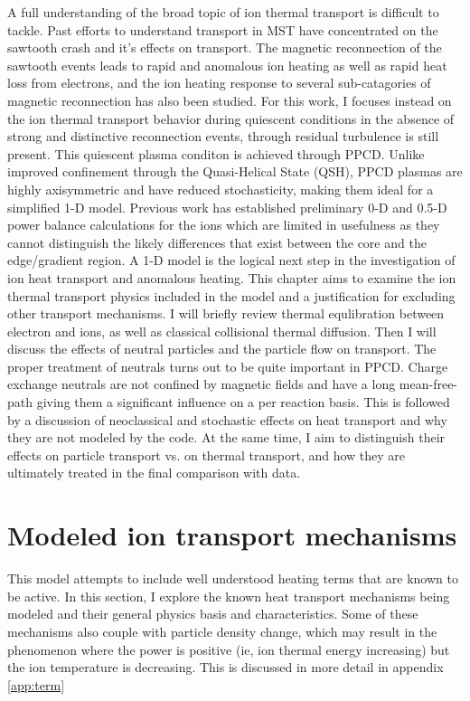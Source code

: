 \begin{refsection}
A full understanding of the broad topic of ion thermal transport is difficult to tackle. Past efforts to understand transport in MST have concentrated on the sawtooth crash and it's effects on transport. The magnetic reconnection of the sawtooth events leads to rapid and anomalous ion heating as well as rapid heat loss from electrons\cite{Chapman2010}, and the ion heating response to several sub-catagories of magnetic reconnection has also been studied\cite{Gangadhara2008}. For this work, I focuses instead on the ion thermal transport behavior during quiescent conditions in the absence of strong and distinctive reconnection events, through residual turbulence is still present. This quiescent plasma conditon is achieved through PPCD. Unlike improved confinement through the Quasi-Helical State (QSH), PPCD plasmas are highly axisymmetric and have reduced stochasticity, making them ideal for a simplified 1-D model. Previous work has established preliminary 0-D and 0.5-D power balance calculations for the ions\cite{Waksman2013} which are limited in usefulness as they cannot distinguish the likely differences that exist between the core and the edge/gradient region. A 1-D model is the logical next step in the investigation of ion heat transport and anomalous heating. This chapter aims to examine the ion thermal transport physics included in the model and a justification for excluding other transport mechanisms.  I will briefly review thermal equlibration between electron and ions, as well as classical collisional thermal diffusion. Then I will discuss the effects of neutral particles and the particle flow on transport. The proper treatment of neutrals turns out to be quite important in PPCD. Charge exchange neutrals are not confined by magnetic fields and have a long mean-free-path giving them a significant influence on a per reaction basis. This is followed by a discussion of neoclassical and stochastic effects on heat transport and why they are not modeled by the code. At the same time, I aim to distinguish their effects on particle transport vs. on thermal transport, and how they are ultimately treated in the final comparison with data. 


\section{Modeled ion transport mechanisms}
This model attempts to include well understood heating terms that are known to be active. In this section, I explore the known heat transport mechanisms being modeled and their general physics basis and characteristics. Some of these mechanisms also couple with particle density change, which may result in the phenomenon where the power is positive (ie, ion thermal energy increasing) but the ion temperature is decreasing. This is discussed in more detail in appendix \ref{app:term}


\end{refsection}
